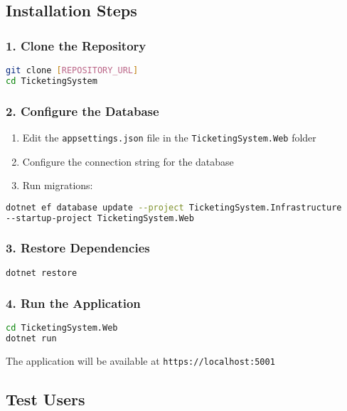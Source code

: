 \documentclass[12pt,a4paper]{article}
\begin{document}
\subsection{Installation Steps}

\subsubsection{1. Clone the Repository}
\begin{lstlisting}[language=bash]
git clone [REPOSITORY_URL]
cd TicketingSystem
\end{lstlisting}

\subsubsection{2. Configure the Database}
\begin{enumerate}
    \item Edit the \texttt{appsettings.json} file in the \texttt{TicketingSystem.Web} folder
    \item Configure the connection string for the database
    \item Run migrations:
\end{enumerate}

\begin{lstlisting}[language=bash]
dotnet ef database update --project TicketingSystem.Infrastructure 
--startup-project TicketingSystem.Web
\end{lstlisting}

\subsubsection{3. Restore Dependencies}
\begin{lstlisting}[language=bash]
dotnet restore
\end{lstlisting}

\subsubsection{4. Run the Application}
\begin{lstlisting}[language=bash]
cd TicketingSystem.Web
dotnet run
\end{lstlisting}

The application will be available at \texttt{https://localhost:5001}

\subsection{Test Users}
\end{document}
